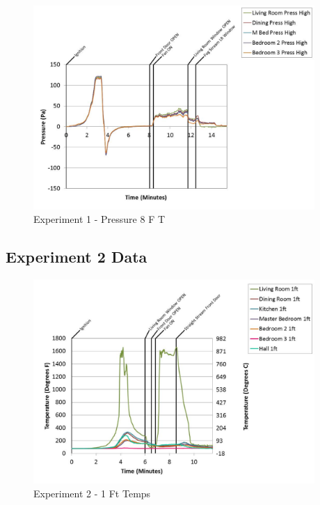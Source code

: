 \documentclass{article}
\begin{document}
\begin{appendices}
	\clearpage

	\begin{figure}[h!]
		\centering
		\includegraphics[height=3.05in]{0_Images/Results_Charts/Exp_1_Charts/Pressure8FT.pdf}
		\caption{Experiment 1 - Pressure 8 F T}
	\end{figure}
 

		\clearpage
\clearpage		\large
\subsection{Experiment 2 Data} \label{App:Exp2Results} 

	\begin{figure}[h!]
		\centering
		\includegraphics[height=3.05in]{0_Images/Results_Charts/Exp_2_Charts/1FtTemps.pdf}
		\caption{Experiment 2 - 1 Ft Temps}
	\end{figure}
 


\end{appendices}
\end{document}

